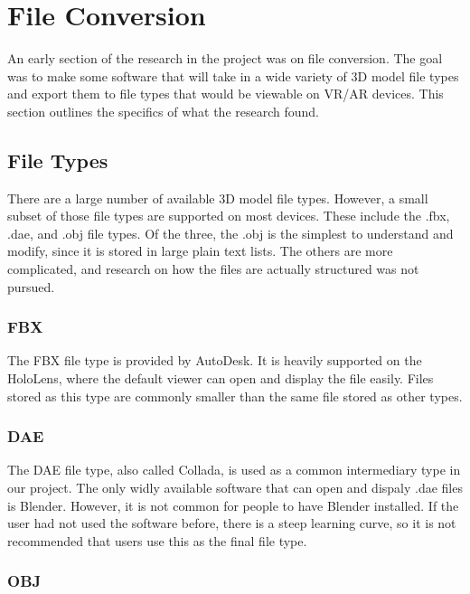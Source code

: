 
\section{File Conversion}

    An early section of the research in the project was on file conversion.  The goal was to make some software that will take in a wide variety of 3D model file types and export them to file types that would be viewable on VR/AR devices.  This section outlines the specifics of what the research found.

    \subsection{File Types}

        There are a large number of available 3D model file types.  However, a small subset of those file types are supported on most devices.  These include the .fbx, .dae, and .obj file types.  Of the three, the .obj is the simplest to understand and modify, since it is stored in large plain text lists.  The others are more complicated, and research on how the files are actually structured was not pursued.

        \subsubsection{FBX}

            The FBX file type is provided by AutoDesk.  It is heavily supported on the HoloLens, where the default viewer can open and display the file easily.  Files stored as this type are commonly smaller than the same file stored as other types.

        \subsubsection{DAE}

            The DAE file type, also called Collada, is used as a common intermediary type in our project.  The only widly available software that can open and dispaly .dae files is Blender.  However, it is not common for people to have Blender installed.  If the user had not used the software before, there is a steep learning curve, so it is not recommended that users use this as the final file type.

        \subsubsection{OBJ}

